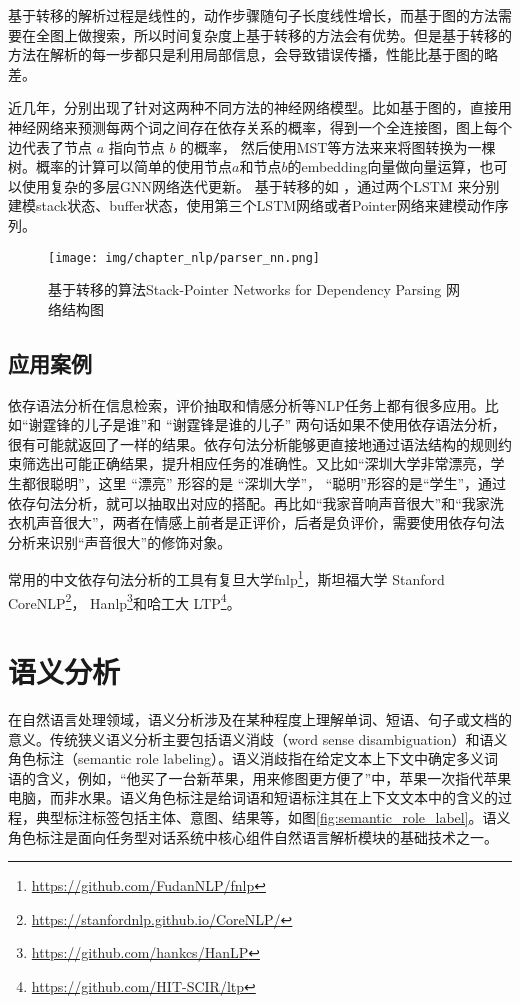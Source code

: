 基于转移的解析过程是线性的，动作步骤随句子长度线性增长，而基于图的方法需要在全图上做搜索，所以时间复杂度上基于转移的方法会有优势。但是基于转移的方法在解析的每一步都只是利用局部信息，会导致错误传播，性能比基于图的略差。

近几年，分别出现了针对这两种不同方法的神经网络模型。比如基于图的\cite{dozat2016deep, ji2019graph, ma2017neural}，直接用神经网络来预测每两个词之间存在依存关系的概率，得到一个全连接图，图上每个边代表了节点 $a$ 指向节点 $b$ 的概率， 然后使用MST等方法来来将图转换为一棵树。概率的计算可以简单的使用节点$a$和节点$b$的embedding向量做向量运算，也可以使用复杂的多层GNN网络迭代更新。 基于转移的如 \cite{fernandez2019left, kiperwasser2016simple, ma2018stack}，通过两个LSTM 来分别建模stack状态、buffer状态，使用第三个LSTM网络或者Pointer网络来建模动作序列。 
\begin{figure}[h]
\centering
\texttt{[image: img/chapter\_nlp/parser\_nn.png]}
\caption{基于转移的算法Stack-Pointer Networks for Dependency Parsing 网络结构图}
\label{fig:parser_nn}
\end{figure}


\subsection{应用案例}
依存语法分析在信息检索，评价抽取和情感分析等NLP任务上都有很多应用。比如“谢霆锋的儿子是谁”和
“谢霆锋是谁的儿子” 两句话如果不使用依存语法分析，很有可能就返回了一样的结果。依存句法分析能够更直接地通过语法结构的规则约束筛选出可能正确结果，提升相应任务的准确性。又比如“深圳大学非常漂亮，学生都很聪明”，这里 “漂亮” 形容的是 “深圳大学”， “聪明”形容的是“学生”，通过依存句法分析，就可以抽取出对应的搭配。再比如“我家音响声音很大”和“我家洗衣机声音很大”，两者在情感上前者是正评价，后者是负评价，需要使用依存句法分析来识别“声音很大”的修饰对象。

常用的中文依存句法分析的工具有复旦大学fnlp\footnote{\url{https://github.com/FudanNLP/fnlp}}，斯坦福大学 Stanford CoreNLP\footnote{\url{https://stanfordnlp.github.io/CoreNLP/}}， Hanlp\footnote{\url{https://github.com/hankcs/HanLP}}和哈工大 LTP\footnote{\url{https://github.com/HIT-SCIR/ltp}}。





\section{语义分析}
在自然语言处理领域，语义分析涉及在某种程度上理解单词、短语、句子或文档的意义。传统狭义语义分析主要包括语义消歧（word sense disambiguation）\cite{ yarowsky1995unsupervised}和语义角色标注（semantic role labeling）\cite{ carreras2005introduction, bjorkelund2009multilingual}。语义消歧指在给定文本上下文中确定多义词语的含义，例如，“他买了一台新苹果，用来修图更方便了”中，苹果一次指代苹果电脑，而非水果。语义角色标注是给词语和短语标注其在上下文文本中的含义的过程，典型标注标签包括主体、意图、结果等，如图\ref{fig:semantic_role_label}。语义角色标注是面向任务型对话系统中核心组件自然语言解析模块的基础技术之一。

